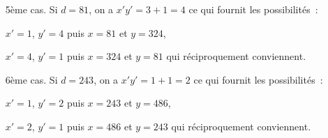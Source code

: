 {{\begin{itemize}
$x'=1$, $y'=10$ puis $x=27$ et $y=270$,
 
$x'=2$, $y'=5$ puis $x=54$ et $y=135$,

$x'=5$, $y'=2$ puis $x=135$ et $y=54$,
 
$x'=10$, $y'=1$ puis $x=270$ et $y=27$ qui réciproquement conviennent.
\item[5ème cas.] Si $d=81$, on a $x'y'=3+1=4$ ce qui fournit les possibilités~:

$x'=1$, $y'=4$ puis $x=81$ et $y=324$,
 
$x'=4$, $y'=1$ puis $x=324$ et $y=81$ qui réciproquement conviennent.
\item[6ème cas.] Si $d=243$, on a $x'y'=1+1=2$ ce qui fournit les possibilités~:

$x'=1$, $y'=2$ puis $x=243$ et $y=486$,
 
$x'=2$, $y'=1$ puis $x=486$ et $y=243$ qui réciproquement conviennent.
\end{itemize}
}
}
